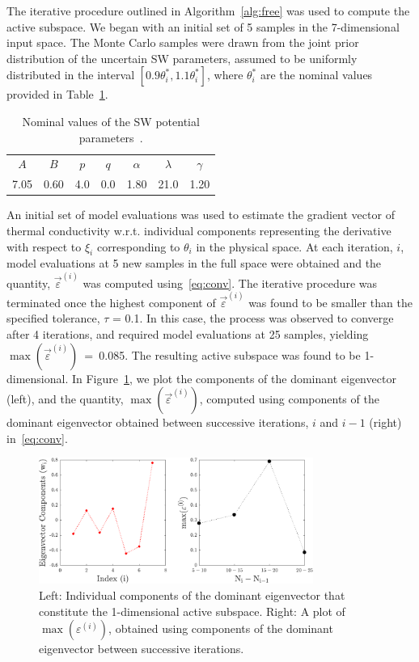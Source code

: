 The iterative procedure outlined in Algorithm~\ref{alg:free} was used to compute the active subspace. 
We began
with an initial set of 5 samples in the 7-dimensional input space. The Monte Carlo samples were drawn
from the joint prior distribution of the uncertain SW parameters, assumed
to be uniformly distributed in the interval $[0.9\theta_i^\ast,1.1\theta_i^\ast]$, where $\theta_i^\ast$ are the
nominal values provided in Table~\ref{tab:sw}. 
%
\begin{table}[htbp]
\centering
{}
\begin{tabular}{@{}ccccccc@{}}\toprule
$A$ & $B$ & $p$ & $q$ & $\alpha$ & $\lambda$ & $\gamma$ \\
7.05 & 0.60 & 4.0 & 0.0 & 1.80 & 21.0 & 1.20 \\
\bottomrule
\end{tabular}
\caption{Nominal values of the SW potential parameters~\cite{Stillinger:1985}.}
\label{tab:sw}
\end{table}
%
An initial set of model evaluations was used to estimate the gradient vector of thermal conductivity w.r.t.
individual components representing the derivative with respect to $\xi_i$ corresponding to $\theta_i$ in
the physical space. At each iteration, $i$, model evaluations at 5 new samples in the full space were 
obtained and the quantity, $\vec{\varepsilon}^{(i)}$ was computed using~\eqref{eq:conv}. The iterative
procedure was terminated once the highest component of $\vec{\varepsilon}^{(i)}$ was found to be smaller than
the specified tolerance, $\tau$ = 0.1. In this case, the process was observed to converge after 4 iterations,
and required model evaluations at 25 samples, yielding $\max(\vec{\varepsilon}^{(i)})$~=~0.085.
 The resulting active subspace was found to be
1-dimensional. In Figure~\ref{fig:casfig1}, we plot the components of the dominant eigenvector (left),
and the quantity, $\max(\vec{\varepsilon}^{(i)})$, computed using components of the dominant eigenvector 
obtained between successive iterations, $i$ and $i-1$ (right) in~\eqref{eq:conv}.
%
\begin{figure}[htbp]
\begin{center}
\includegraphics[width=0.8\textwidth]{./Figures/free_eigv5}
\caption{Left: Individual components of the dominant eigenvector that constitute the 1-dimensional
active subspace. Right: A plot of $\max(\varepsilon^{(i)})$, obtained
using components of the dominant eigenvector between successive iterations.}
\label{fig:casfig1}
\end{center}
\end{figure}
%

